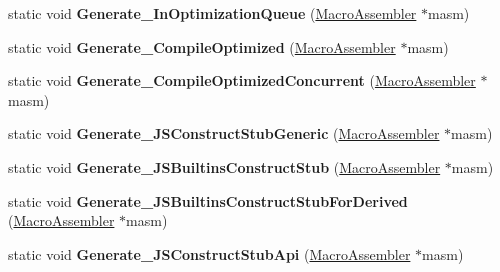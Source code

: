 \begin{DoxyCompactItemize}
\item 
static void {\bfseries Generate\+\_\+\+In\+Optimization\+Queue} (\hyperlink{classv8_1_1internal_1_1_macro_assembler}{Macro\+Assembler} $\ast$masm)\hypertarget{classv8_1_1internal_1_1_builtins_ad8bedd0883c49619099e1f03f87fee30}{}\label{classv8_1_1internal_1_1_builtins_ad8bedd0883c49619099e1f03f87fee30}

\item 
static void {\bfseries Generate\+\_\+\+Compile\+Optimized} (\hyperlink{classv8_1_1internal_1_1_macro_assembler}{Macro\+Assembler} $\ast$masm)\hypertarget{classv8_1_1internal_1_1_builtins_abaa66a571a881ba439d9d97bc937e40d}{}\label{classv8_1_1internal_1_1_builtins_abaa66a571a881ba439d9d97bc937e40d}

\item 
static void {\bfseries Generate\+\_\+\+Compile\+Optimized\+Concurrent} (\hyperlink{classv8_1_1internal_1_1_macro_assembler}{Macro\+Assembler} $\ast$masm)\hypertarget{classv8_1_1internal_1_1_builtins_adb12deca1bf53dcc0a5bc610a9355807}{}\label{classv8_1_1internal_1_1_builtins_adb12deca1bf53dcc0a5bc610a9355807}

\item 
static void {\bfseries Generate\+\_\+\+J\+S\+Construct\+Stub\+Generic} (\hyperlink{classv8_1_1internal_1_1_macro_assembler}{Macro\+Assembler} $\ast$masm)\hypertarget{classv8_1_1internal_1_1_builtins_adb189f615ac5e0e5d2364b99325e669c}{}\label{classv8_1_1internal_1_1_builtins_adb189f615ac5e0e5d2364b99325e669c}

\item 
static void {\bfseries Generate\+\_\+\+J\+S\+Builtins\+Construct\+Stub} (\hyperlink{classv8_1_1internal_1_1_macro_assembler}{Macro\+Assembler} $\ast$masm)\hypertarget{classv8_1_1internal_1_1_builtins_ad702b9902464514ba994cf059e0d3bdb}{}\label{classv8_1_1internal_1_1_builtins_ad702b9902464514ba994cf059e0d3bdb}

\item 
static void {\bfseries Generate\+\_\+\+J\+S\+Builtins\+Construct\+Stub\+For\+Derived} (\hyperlink{classv8_1_1internal_1_1_macro_assembler}{Macro\+Assembler} $\ast$masm)\hypertarget{classv8_1_1internal_1_1_builtins_ae77af552232db481f6d3057ed2dfec4f}{}\label{classv8_1_1internal_1_1_builtins_ae77af552232db481f6d3057ed2dfec4f}

\item 
static void {\bfseries Generate\+\_\+\+J\+S\+Construct\+Stub\+Api} (\hyperlink{classv8_1_1internal_1_1_macro_assembler}{Macro\+Assembler} $\ast$masm)\hypertarget{classv8_1_1internal_1_1_builtins_a7afecd4390b2bff72d50ff3cbae79171}{}\label{classv8_1_1internal_1_1_builtins_a7afecd4390b2bff72d50ff3cbae79171}


\end{DoxyCompactItemize}
